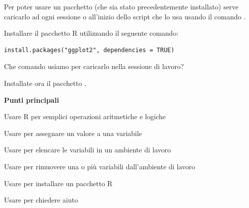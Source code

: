 \noindent Per poter usare un pacchetto (che sia stato precedentemente installato) serve caricarlo ad ogni sessione o all'inizio dello script che lo usa usando il comando .



\vspace{0.5cm} 

\begin{exercise}\label{ex2.5}

\noindent Installare il pacchetto R  utilizzando il seguente comando: 

\begin{lstlisting}[style=Rstyle]
install.packages("ggplot2", dependencies = TRUE)
\end{lstlisting}
%
Che comando usiamo per caricarlo nella sessione di lavoro?

\noindent Installate ora il pacchetto .

\end{exercise}	


\vspace{0.5cm}

\begin{tcolorbox}[width=1\linewidth, halign=left, colframe=blue!60, colback=white, boxsep=1mm, arc=3mm]

\textbf{Punti principali}

\begin{myitemize}
    \item Usare  R per semplici operazioni aritmetiche e logiche
    \item Usare \lsin{<-} per assegnare un valore a una variabile
    \item Usare  per elencare le variabili in un ambiente di lavoro 
    \item Usare  per rimuovere una o pi\`u variabili dall'ambiente di lavoro 
    \item Usare  per installare un pacchetto R
	\item Usare  per chiedere aiuto 
\end{myitemize}

\end{tcolorbox} 


